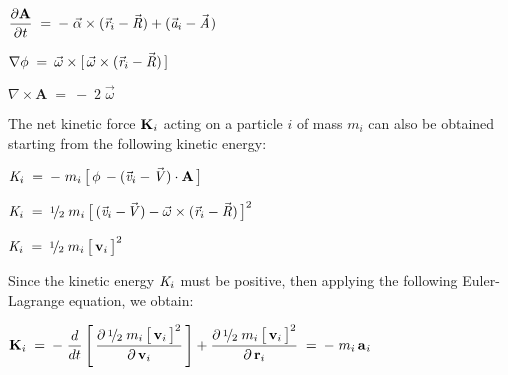 \documentclass[10pt]{article}
\newcommand{\med}{\raise.5ex\hbox{$\scriptstyle 1$}\kern-.15em/\kern-.09em\lower.25ex\hbox{$\scriptstyle 2$}}
\begin{document}
\par \bigskip $\dfrac{\partial{\mathbf{A}}}{\partial{\hspace{+0.03em}t}} \;=\: - \; {\vec{\alpha}} \times ({\vec{\mathit{r}}}_{i} - {\vec{\mathit{R}}}) + ( {\vec{\mathit{a}}}_{i} - {\vec{\mathit{A}}}\hspace{+0.06em})$

\par \bigskip $\nabla \phi \;=\: {\vec{\omega}} \times [ \, {\vec{\omega}} \times ({\vec{\mathit{r}}}_{i} - {\vec{\mathit{R}}}) \, ] \hspace{+0.06em}$

\par \bigskip $\nabla \times {\mathbf{A}} \;=\: - \; 2 \; {\vec{\omega}}$

\par \bigskip \noindent The net kinetic force ${\mathbf{K}}_{\hspace{+0.009em}i}$ acting on a particle $i$ of mass $m_i$ can also be obtained starting from the following kinetic energy:

\par \bigskip ${\mathit{K}}_{\hspace{+0.009em}i} \;=\: - \; m_i \, \big[ \, \phi \, - ({\vec{\mathit{v}}}_{i} - {\vec{\mathit{V}}}) \cdot {\mathbf{A}} \, \big]$

\par \bigskip ${\mathit{K}}_{\hspace{+0.009em}i} \;=\: \med \; m_i \, \big[ \, ({\vec{\mathit{v}}}_i - \hspace{-0.120em}{\vec{\mathit{V}}}) - {\vec{\omega}} \times ({\vec{\mathit{r}}}_i - {\vec{\mathit{R}}}) \, \big]^2$

\par \bigskip ${\mathit{K}}_{\hspace{+0.009em}i} \;=\: \med \; m_i \, \big[ \, {\mathbf{v}}_i \, \big]^2$

\vspace{+0.03em}

\par \bigskip \noindent Since the kinetic energy ${\mathit{K}}_{\hspace{+0.009em}i}$ must be positive, then applying the following Euler-Lagrange equation, we obtain:

\vspace{+0.06em}

\par \bigskip ${\mathbf{K}}_{\hspace{+0.009em}i} \;=\: - \; \dfrac{d}{dt} \, \Bigg[ \, \dfrac{\partial{\, \med \; m_i \, \big[ \, {\mathbf{v}}_i \, \big]^2}}{\partial{\,\mathbf{v}}_i} \, \Bigg] + \dfrac{\partial{\, \med \; m_i \, \big[ \, {\mathbf{v}}_i \, \big]^2}}{\partial{\,\mathbf{r}}_i} \;=\: - \; m_i \, {\mathbf{a}}_{\hspace{+0.045em}i}$
\end{document}
